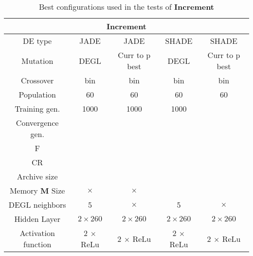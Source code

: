 \begin{table}[]
	\centering
	\begin{tabular}{|c|c|c|c|c|}
		\hline
		\multicolumn{5}{|c|}{\textbf{Increment}} \\ \hline
		DE type & JADE & JADE & SHADE & SHADE \\ \hline
		Mutation & DEGL & Curr to p best & DEGL & Curr to p best  \\ \hline
		Crossover & bin & bin & bin & bin \\ \hline
		Population & 60 & 60 & 60 & 60 \\ \hline
		Training gen. & 1000 & 1000 & 1000 & \\ \hline
		Convergence gen. & & & & \\ \hline
		F & & & & \\ \hline
		CR & & & & \\ \hline
		Archive size & & & & \\ \hline
		Memory \textbf{M} Size & $\times$ & $\times$ & & \\ \hline
		DEGL neighbors & 5 & $\times$ & 5 & $\times$ \\ \hline
		Hidden Layer & $2 \times 260$ & $2 \times 260$ & $2 \times 260$ &  $2 \times 260$\\ \hline
		Activation function & 2 $\times$ ReLu & 2 $\times$ ReLu & 2 $\times$ ReLu & 2 $\times$ ReLu \\ \hline
	\end{tabular}
	\caption{Best configurations used in the tests of \textbf{Increment}}
	\label{tbl:tests-configurations-increment}
\end{table}

